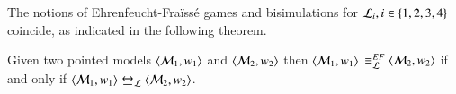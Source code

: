 The notions of
Ehrenfeucht-Fra\"iss\'e games and bisimulations for $\mathcal{L}_i,
i \in \linebreak \{1,2,3,4\}$ coincide, as indicated in the following theorem.

\begin{thm}\label{thm:equiv-g-s}
Given two pointed models $\langle \mathcal{M}_1,w_1 \rangle$ and
$\langle \mathcal{M}_2,w_2 \rangle$ then $\langle \mathcal{M}_1,w_1 \rangle$ $\equiv^{EF}_{\mathcal{L}} \langle \mathcal{M}_2,w_2 \rangle$
if and only if $\tup{\model_1,w_1} \bisim_\gL \tup{\model_2,w_2}$.
\end{thm}

